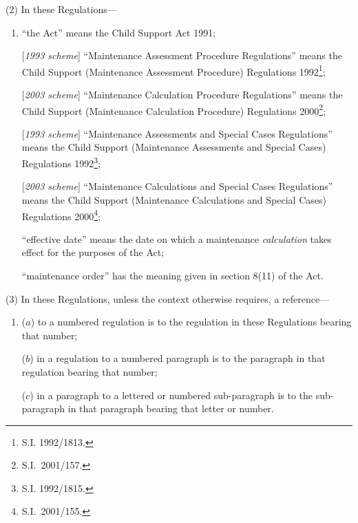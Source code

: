 \documentclass[12pt,a4paper]{article}
\begin{document}
(2) In these Regulations—
\begin{enumerate}\item[]
“the Act” means the Child Support Act 1991;

[\emph{1993 scheme}] “Maintenance Assessment Procedure Regulations” means the Child Support (Maintenance Assessment Procedure) Regulations 1992\footnote{\frenchspacing S.I. 1992/1813.};

\begin{sloppypar}
[\emph{2003 scheme}] “Maintenance Calculation Procedure Regulations” means the Child Support (Maintenance Calculation Procedure) Regulations 2000\footnote{S.I.\ 2001/157.}; %
\end{sloppypar}

[\emph{1993 scheme}] “Maintenance Assessments and Special Cases Regulations” means the Child Support (Maintenance Assessments and Special Cases) Regulations 1992\footnote{\frenchspacing S.I. 1992/1815.};

[\emph{2003 scheme}] “Maintenance Calculations and Special Cases Regulations” means the Child Support (Maintenance Calculations and Special Cases) Regulations 2000\footnote{S.I.\ 2001/155.}; %

“effective date” means the date on which a maintenance 
\emph{calculation}
takes effect for the purposes of the Act;

“maintenance order” has the meaning given in section 8(11) of the Act.
\end{enumerate}

(3) In these Regulations, unless the context otherwise requires, a reference—
\begin{enumerate}\item[]
($a$) to a numbered regulation is to the regulation in these Regulations bearing that number;

($b$) in a regulation to a numbered paragraph is to the paragraph in that regulation bearing that number;

($c$) in a paragraph to a lettered or numbered sub-paragraph is to the sub-paragraph in that paragraph bearing that letter or number.
\end{enumerate}
\end{document}
